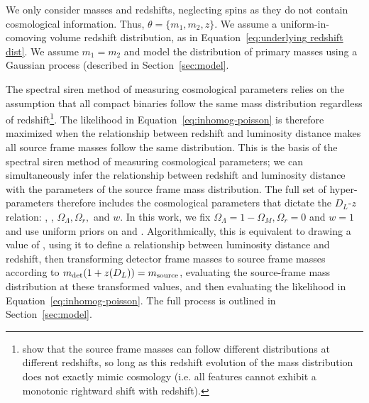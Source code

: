 \documentclass[]{aastex631}
\begin{document}
We only consider masses and redshifts, neglecting spins as they do not contain cosmological information.
Thus, $\theta = \{m_1,m_2,z\}$.
We assume a uniform-in-comoving volume redshift distribution, as in Equation~\ref{eq:underlying redshift dist}.
We assume $m_1=m_2$ and model the distribution of primary masses using a Gaussian process (described in Section~\ref{sec:model}.

The spectral siren method of measuring cosmological parameters relies on the assumption that all compact binaries follow the same mass distribution regardless of redshift\footnote{\citet{ezquiaga_spectral_2022} show that the source frame masses can follow different distributions at different redshifts, so long as this redshift evolution of the mass distribution does not exactly mimic cosmology (i.e. all features cannot exhibit a monotonic rightward shift with redshift).}.
The likelihood in Equation~\ref{eq:inhomog-poisson} is therefore maximized when the relationship between redshift and luminosity distance makes all source frame masses follow the same distribution.
This is the basis of the spectral siren method of measuring cosmological parameters; we can simultaneously infer the relationship between redshift and luminosity distance with the parameters of the source frame mass distribution.
The full set of hyper-parameters therefore includes the cosmological parameters that dictate the $D_L$-$z$ relation: \Ho, \Omm, $\Omega_\Lambda, \Omega_r,$ and $w$.
In this work, we fix $\Omega_\Lambda=1-\Omega_M, \Omega_r=0$ and $w=1$ and use uniform priors on \Ho{} and \Omm{}.
Algorithmically, this is equivalent to drawing a value of \Ho, using it to define a relationship between luminosity distance and redshift, then transforming detector frame masses to source frame masses according to $m_{\det} (1+z(D_L)) = m_{\text{source}}$, evaluating the source-frame mass distribution at these transformed values, and then evaluating the likelihood in Equation~\ref{eq:inhomog-poisson}.
The full process is outlined in Section~\ref{sec:model}.
\end{document}
